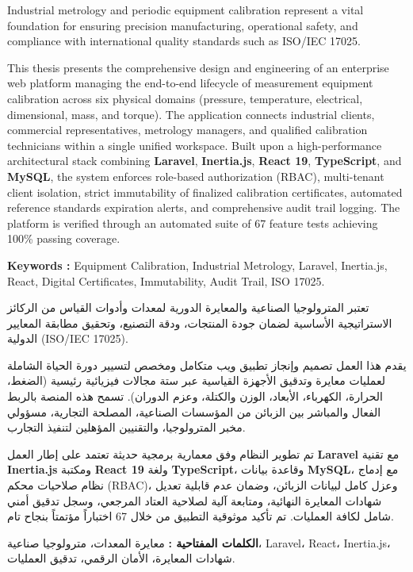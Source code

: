 \documentclass{bts-report}
\begin{document}
\begin{abstracten}
Industrial metrology and periodic equipment calibration represent a vital foundation for ensuring precision manufacturing, operational safety, and compliance with international quality standards such as ISO/IEC 17025. 

This thesis presents the comprehensive design and engineering of an enterprise web platform managing the end-to-end lifecycle of measurement equipment calibration across six physical domains (pressure, temperature, electrical, dimensional, mass, and torque). The application connects industrial clients, commercial representatives, metrology managers, and qualified calibration technicians within a single unified workspace. Built upon a high-performance architectural stack combining \textbf{Laravel}, \textbf{Inertia.js}, \textbf{React 19}, \textbf{TypeScript}, and \textbf{MySQL}, the system enforces role-based authorization (RBAC), multi-tenant client isolation, strict immutability of finalized calibration certificates, automated reference standards expiration alerts, and comprehensive audit trail logging. The platform is verified through an automated suite of 67 feature tests achieving 100\% passing coverage.

\vspace{0.6cm}
\noindent\textbf{Keywords :} Equipment Calibration, Industrial Metrology, Laravel, Inertia.js, React, Digital Certificates, Immutability, Audit Trail, ISO 17025.
\end{abstracten}

\begin{abstractar}
تعتبر المترولوجيا الصناعية والمعايرة الدورية لمعدات وأدوات القياس من الركائز الاستراتيجية الأساسية لضمان جودة المنتجات، ودقة التصنيع، وتحقيق مطابقة المعايير الدولية (ISO/IEC 17025). 

يقدم هذا العمل تصميم وإنجاز تطبيق ويب متكامل ومخصص لتسيير دورة الحياة الشاملة لعمليات معايرة وتدقيق الأجهزة القياسية عبر ستة مجالات فيزيائية رئيسية (الضغط، الحرارة، الكهرباء، الأبعاد، الوزن والكتلة، وعزم الدوران). تسمح هذه المنصة بالربط الفعال والمباشر بين الزبائن من المؤسسات الصناعية، المصلحة التجارية، مسؤولي مخبر المترولوجيا، والتقنيين المؤهلين لتنفيذ التجارب. 

تم تطوير النظام وفق معمارية برمجية حديثة تعتمد على إطار العمل \textbf{Laravel} مع تقنية \textbf{Inertia.js} ومكتبة \textbf{React 19} ولغة \textbf{TypeScript}، وقاعدة بيانات \textbf{MySQL}، مع إدماج نظام صلاحيات محكم (RBAC)، وعزل كامل لبيانات الزبائن، وضمان عدم قابلية تعديل شهادات المعايرة النهائية، ومتابعة آلية لصلاحية العتاد المرجعي، وسجل تدقيق أمني شامل لكافة العمليات. تم تأكيد موثوقية التطبيق من خلال 67 اختباراً مؤتمتاً بنجاح تام.

\vspace{0.6cm}
\noindent\textbf{الكلمات المفتاحية :} معايرة المعدات، مترولوجيا صناعية، Laravel، React، Inertia.js، شهادات المعايرة، الأمان الرقمي، تدقيق العمليات.
\end{abstractar}
\end{document}
